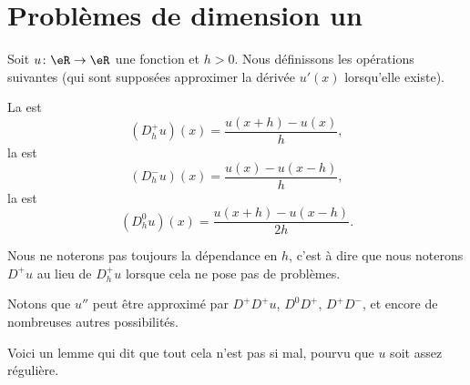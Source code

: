 
\section{Problèmes de dimension un}

Soit \( u\colon \eR\to \eR\) une fonction et \( h>0\). Nous définissons les opérations suivantes (qui sont supposées approximer la dérivée \( u'(x)\) lorsqu'elle existe).

\begin{definition}
    La  est 
    \begin{equation}
        (D^+_hu)(x)=\frac{ u(x+h)-u(x) }{ h },
    \end{equation}
    la  est 
    \begin{equation}
        (D^-_hu)(x)=\frac{ u(x)-u(x-h) }{ h },
    \end{equation}
    la  est 
    \begin{equation}
        (D^0_hu)(x)=\frac{ u(x+h)-u(x-h) }{ 2h }.
    \end{equation}
\end{definition}
Nous ne noterons pas toujours la dépendance en \( h\), c'est à dire que nous noterons \( D^+u\) au lieu de \( D^+_hu\) lorsque cela ne pose pas de problèmes.

Notons que \( u''\) peut être approximé par \( D^+D^+u\), \( D^0D^+\), \( D^+D^-\), et encore de nombreuses autres possibilités.

Voici un lemme qui dit que tout cela n'est pas si mal, pourvu que \( u\) soit assez régulière.

